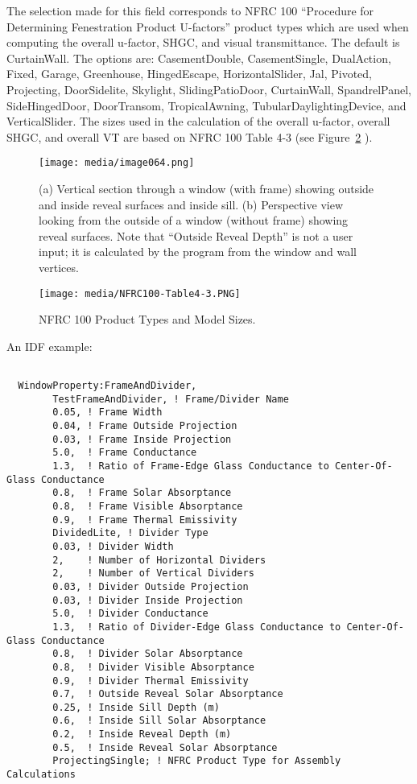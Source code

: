 The selection made for this field corresponds to NFRC 100 ``Procedure for Determining Fenestration Product U-factors'' product types which are used when computing the overall u-factor, SHGC, and visual transmittance. The default is CurtainWall. The options are: CasementDouble, CasementSingle, DualAction, Fixed, Garage, Greenhouse, HingedEscape, HorizontalSlider, Jal, Pivoted, Projecting, DoorSidelite, Skylight, SlidingPatioDoor, CurtainWall, SpandrelPanel, SideHingedDoor, DoorTransom, TropicalAwning, TubularDaylightingDevice, and VerticalSlider. The sizes used in the calculation of the overall u-factor, overall SHGC, and overall VT are based on NFRC 100 Table 4-3 (see Figure~\ref{fig:nfrc100-product-types} ). 


\begin{figure}[hbtp] %
\centering
\texttt{[image: media/image064.png]}
\caption{(a) Vertical section through a window (with frame) showing outside and inside reveal surfaces and inside sill. (b) Perspective view looking from the outside of a window (without frame) showing reveal surfaces. Note that “Outside Reveal Depth” is not a user input; it is calculated by the program from the window and wall vertices. \protect \label{fig:a-vertical-section-through-a-window-with}}
\end{figure}

\begin{figure}[hbtp] %
\centering
\texttt{[image: media/NFRC100-Table4-3.PNG]}
\caption{NFRC 100 Product Types and Model Sizes. \protect \label{fig:nfrc100-product-types}}
\end{figure}

An IDF example:

\begin{lstlisting}

  WindowProperty:FrameAndDivider,
        TestFrameAndDivider, ! Frame/Divider Name
        0.05, ! Frame Width
        0.04, ! Frame Outside Projection
        0.03, ! Frame Inside Projection
        5.0,  ! Frame Conductance
        1.3,  ! Ratio of Frame-Edge Glass Conductance to Center-Of-Glass Conductance
        0.8,  ! Frame Solar Absorptance
        0.8,  ! Frame Visible Absorptance
        0.9,  ! Frame Thermal Emissivity
        DividedLite, ! Divider Type
        0.03, ! Divider Width
        2,    ! Number of Horizontal Dividers
        2,    ! Number of Vertical Dividers
        0.03, ! Divider Outside Projection
        0.03, ! Divider Inside Projection
        5.0,  ! Divider Conductance
        1.3,  ! Ratio of Divider-Edge Glass Conductance to Center-Of-Glass Conductance
        0.8,  ! Divider Solar Absorptance
        0.8,  ! Divider Visible Absorptance
        0.9,  ! Divider Thermal Emissivity
        0.7,  ! Outside Reveal Solar Absorptance
        0.25, ! Inside Sill Depth (m)
        0.6,  ! Inside Sill Solar Absorptance
        0.2,  ! Inside Reveal Depth (m)
        0.5,  ! Inside Reveal Solar Absorptance
        ProjectingSingle; ! NFRC Product Type for Assembly Calculations
\end{lstlisting}

